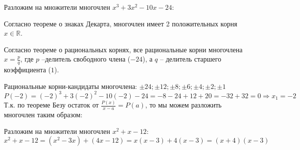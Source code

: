 \documentclass[a4paper]{article}
\begin{document}
Разложим на множители многочлен $x^3+3x^2-10x-24$: \par
Согласно теореме о знаках Декарта, многочлен имеет 2 положительных корня $x \in \mathbb{R}$. \par
Согласно теореме о рациональных корнях, все рациональные корни многочлена $x=\frac{p}{q}$, где $p$ --делитель свободного члена ($-24$), а $q$ -- делитель старшего коэффициента ($1$). \par
Рациональные корни-кандидаты многочлена: $\pm24; \pm12; \pm8; \pm6; \pm4; \pm2; \pm1$
\[P(-2)=(-2)^3+3(-2)^2-10(-2)-24=-8-24+12+20=-32+32=0 \Rightarrow x_1=-2\]
Т.к. по теореме Безу остаток от $\frac{P(x)}{x-a}=P(a)$, то мы можем разложить многочлен таким образом: \par
{}

Разложим на множители многочлен $x^2+x-12$:
\[x^2+x-12=(x^2-3x)+(4x-12)=x(x-3)+4(x-3)=(x+4)(x-3)\]
\end{document}
